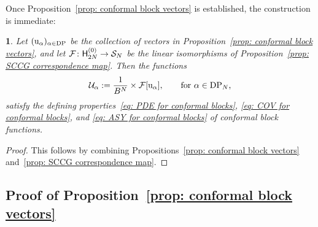 \documentclass[oneside,english]{amsart}
\numberwithin{equation}{section}
\numberwithin{figure}{section}
\theoremstyle{plain}
\theoremstyle{plain}
\newtheorem{thm}{\protect\theoremname}%
\theoremstyle{plain}
\theoremstyle{remark}
\theoremstyle{plain}
\theoremstyle{plain}
\theoremstyle{plain}
\theoremstyle{plain}
\theoremstyle{plain}
\theoremstyle{plain}
\theoremstyle{plain}
\theoremstyle{plain}
\providecommand{\theoremname}{Theorem}
\newcommand{\red}[1]{{\color{red} #1}}
\begin{document}
% 

Once Proposition~\ref{prop: conformal block vectors} is established, the
construction %
is immediate:
\begin{thm}\label{thm: conformal block functions}
Let $( \mathrm{u}_\alpha )_{\alpha \in \mathrm{DP}}$ be the collection
of vectors in Proposition~\ref{prop: conformal block vectors}, and let 
$\mathcal{F} \colon \mathsf{H}_{2N}^{(0)} \to \mathcal{S}_N$ 
be the linear isomorphisms of Proposition~\ref{prop: SCCG correspondence map}.
Then the functions
\[ \mathcal{U}_\alpha := \frac{1}{B^N} \times \mathcal{F}[\mathrm{u}_\alpha]  , \qquad \text{for $\alpha \in \mathrm{DP}_N$,}\]
satisfy the defining %
properties~\eqref{eq: PDE for conformal blocks}, \eqref{eq: COV for conformal blocks}, and \eqref{eq: ASY for conformal blocks}
of conformal block functions.
\end{thm}
\begin{proof}
This follows by combining Propositions~\ref{prop: conformal block vectors}
and~\ref{prop: SCCG correspondence map}.
\end{proof}

\subsection{\textbf{Proof of Proposition~\ref{prop: conformal block vectors}}}
\end{document}
